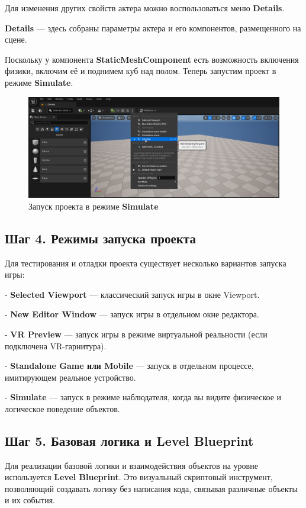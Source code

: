 Для изменения других свойств актера можно воспользоваться меню \textbf{Details}.

\textbf{Details} — здесь собраны параметры актера и его компонентов, размещенного на сцене.

Поскольку у компонента \textbf{StaticMeshComponent} есть возможность включения физики, включим её и поднимем куб над полом. Теперь запустим проект в режиме \textbf{Simulate}.

\begin{figure}[h]
    \centering
    \includegraphics[width=\textwidth]{Lections/StartInSimilate.png}
    \caption{Запуск проекта в режиме \textbf{Simulate}}
\end{figure}

\subsection{Шаг 4. Режимы запуска проекта}

Для тестирования и отладки проекта существует несколько вариантов запуска игры:

- \textbf{Selected Viewport} — классический запуск игры в окне Viewport.

- \textbf{New Editor Window} — запуск игры в отдельном окне редактора. 

- \textbf{VR Preview} — запуск игры в режиме виртуальной реальности (если подключена VR-гарнитура).

- \textbf{Standalone Game или Mobile} — запуск в отдельном процессе, имитирующем реальное устройство.

- \textbf{Simulate} — запуск в режиме наблюдателя, когда вы видите физическое и логическое поведение объектов.

\subsection{Шаг 5. Базовая логика и Level Blueprint}

Для реализации базовой логики и взаимодействия объектов на уровне используется \textbf{Level Blueprint}. Это визуальный скриптовый инструмент, позволяющий создавать логику без написания кода, связывая различные объекты и их события.

